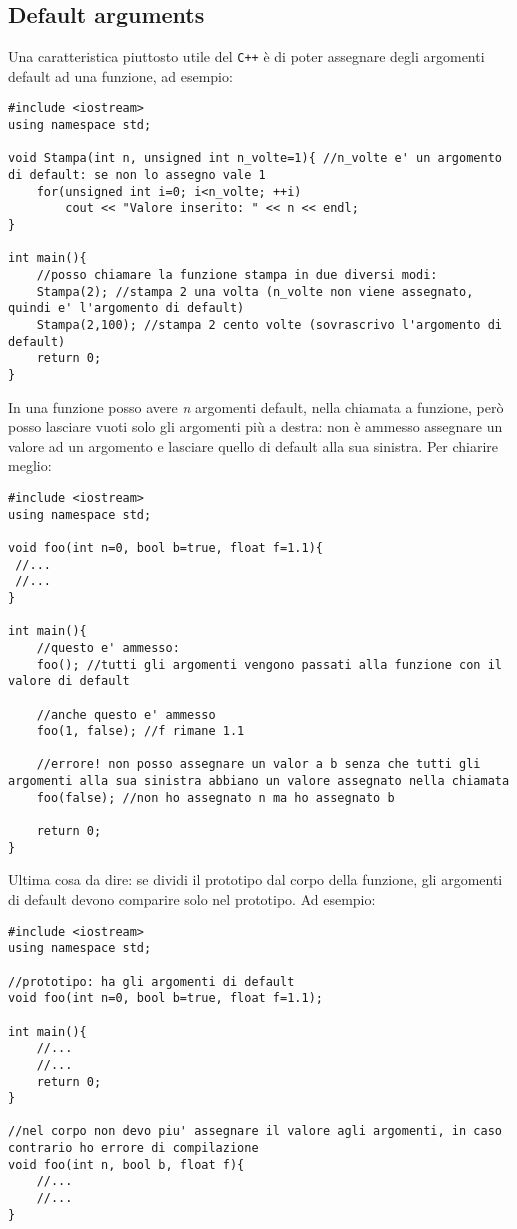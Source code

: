 \subsection{Default arguments}
Una caratteristica piuttosto utile del \verb|C++| è di poter assegnare degli argomenti default ad una funzione, ad esempio:
\begin{lstlisting}
#include <iostream>
using namespace std;

void Stampa(int n, unsigned int n_volte=1){ //n_volte e' un argomento di default: se non lo assegno vale 1
	for(unsigned int i=0; i<n_volte; ++i)
		cout << "Valore inserito: " << n << endl;
}

int main(){
	//posso chiamare la funzione stampa in due diversi modi:
	Stampa(2); //stampa 2 una volta (n_volte non viene assegnato, quindi e' l'argomento di default)
	Stampa(2,100); //stampa 2 cento volte (sovrascrivo l'argomento di default)
	return 0;
}
\end{lstlisting}

In una funzione posso avere \emph{n} argomenti default, nella chiamata a funzione, però posso lasciare vuoti solo gli argomenti più a destra: non è ammesso assegnare un valore ad un argomento e lasciare quello di default alla sua sinistra. Per chiarire meglio:
\begin{lstlisting}
#include <iostream>
using namespace std;

void foo(int n=0, bool b=true, float f=1.1){
 //...
 //...
}

int main(){
	//questo e' ammesso:
	foo(); //tutti gli argomenti vengono passati alla funzione con il valore di default
	
	//anche questo e' ammesso
	foo(1, false); //f rimane 1.1
	
	//errore! non posso assegnare un valor a b senza che tutti gli argomenti alla sua sinistra abbiano un valore assegnato nella chiamata
	foo(false); //non ho assegnato n ma ho assegnato b
	
	return 0;
}
\end{lstlisting}

Ultima cosa da dire: se dividi il prototipo dal corpo della funzione, gli argomenti di default devono comparire solo nel prototipo. Ad esempio:

\begin{lstlisting}
#include <iostream>
using namespace std;

//prototipo: ha gli argomenti di default
void foo(int n=0, bool b=true, float f=1.1);

int main(){
	//...
	//...
	return 0;
}

//nel corpo non devo piu' assegnare il valore agli argomenti, in caso contrario ho errore di compilazione
void foo(int n, bool b, float f){
	//...
	//...
}
\end{lstlisting}
